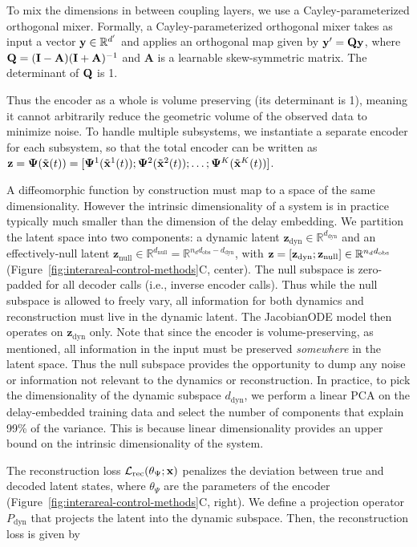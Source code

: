 To mix the dimensions in between coupling layers, we use a Cayley-parameterized orthogonal mixer. Formally, a Cayley-parameterized orthogonal mixer takes as input a vector $\vb{y} \in \mathbb{R}^{d'}$ and applies an orthogonal map given by $\vb{y}' = \vb{Q}\vb{y}$, where $\vb{Q} = (\mathbf{I}-\mathbf{A})(\mathbf{I}+\mathbf{A})^{-1}$ and $\mathbf{A}$ is a learnable skew-symmetric matrix. The determinant of $\vb{Q}$ is 1.

Thus the encoder as a whole is volume preserving (its determinant is 1), meaning it cannot arbitrarily reduce the geometric volume of the observed data to minimize noise. To handle multiple subsystems, we instantiate a separate encoder for each subsystem, so that the total encoder can be written as $\vb{z} = \vb{\Psi}(\tilde{\vb{x}}(t)) = [\vb{\Psi}^1(\tilde{\vb{x}}^1(t)); \vb{\Psi}^2(\tilde{\vb{x}}^2(t)); \ldots; \vb{\Psi}^K(\tilde{\vb{x}}^K(t))]$.

A diffeomorphic function by construction must map to a space of the same dimensionality. However the intrinsic dimensionality of a system is in practice typically much smaller than the dimension of the delay embedding. We partition the latent space into two components: a dynamic latent $\mathbf{z}_{\mathrm{dyn}} \in \mathbb{R}^{d_{\mathrm{dyn}}}$ and an effectively-null latent $\mathbf{z}_{\mathrm{null}} \in \mathbb{R}^{d_{\mathrm{null}}} = \mathbb{R}^{n_d d_{\mathrm{obs}} - d_{\mathrm{dyn}}}$, with $\vb{z} = [\vb{z}_{\mathrm{dyn}}; \vb{z}_{\mathrm{null}}] \in \mathbb{R}^{n_d d_{\mathrm{obs}}}$ (Figure~\ref{fig:interareal-control-methods}C, center). The null subspace is zero-padded for all decoder calls (i.e., inverse encoder calls). Thus while the null subspace is allowed to freely vary, all information for both dynamics and reconstruction must live in the dynamic latent. The JacobianODE model then operates on $\mathbf{z}_{\mathrm{dyn}}$ only. Note that since the encoder is volume-preserving, as mentioned, all information in the input must be preserved \textit{somewhere} in the latent space. Thus the null subspace provides the opportunity to dump any noise or information not relevant to the dynamics or reconstruction. In practice, to pick the dimensionality of the dynamic subspace $d_{\mathrm{dyn}}$, we perform a linear PCA on the delay-embedded training data and select the number of components that explain 99\% of the variance. This is because linear dimensionality provides an upper bound on the intrinsic dimensionality of the system.

 The reconstruction loss $\mathcal{L}_{\mathrm{rec}}(\theta_{\Psi};\vb{x})$ penalizes the deviation between true and decoded latent states, where $\theta_{\Psi}$ are the parameters of the encoder (Figure~\ref{fig:interareal-control-methods}C, right). We define a projection operator $P_{\text{dyn}}$ that projects the latent into the dynamic subspace. Then, the reconstruction loss is given by

